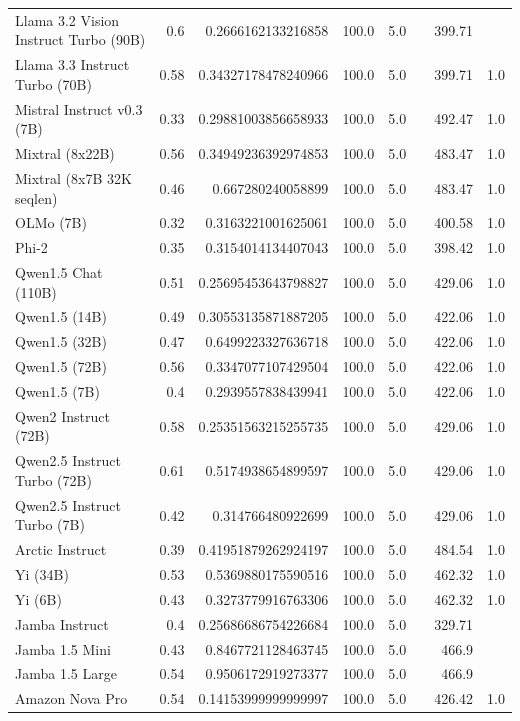 \begin{table}[htp]
{\begin{tabular}{lrrrrrrr}
Llama 3.2 Vision Instruct Turbo (90B) & 0.6 & 0.2666162133216858 & 100.0 & 5.0 &  & 399.71 &  \\
Llama 3.3 Instruct Turbo (70B) & 0.58 & 0.34327178478240966 & 100.0 & 5.0 &  & 399.71 & 1.0 \\
Mistral Instruct v0.3 (7B) & 0.33 & 0.29881003856658933 & 100.0 & 5.0 &  & 492.47 & 1.0 \\
Mixtral (8x22B) & 0.56 & 0.34949236392974853 & 100.0 & 5.0 &  & 483.47 & 1.0 \\
Mixtral (8x7B 32K seqlen) & 0.46 & 0.667280240058899 & 100.0 & 5.0 &  & 483.47 & 1.0 \\
OLMo (7B) & 0.32 & 0.3163221001625061 & 100.0 & 5.0 &  & 400.58 & 1.0 \\
Phi-2 & 0.35 & 0.3154014134407043 & 100.0 & 5.0 &  & 398.42 & 1.0 \\
Qwen1.5 Chat (110B) & 0.51 & 0.25695453643798827 & 100.0 & 5.0 &  & 429.06 & 1.0 \\
Qwen1.5 (14B) & 0.49 & 0.30553135871887205 & 100.0 & 5.0 &  & 422.06 & 1.0 \\
Qwen1.5 (32B) & 0.47 & 0.6499223327636718 & 100.0 & 5.0 &  & 422.06 & 1.0 \\
Qwen1.5 (72B) & 0.56 & 0.3347077107429504 & 100.0 & 5.0 &  & 422.06 & 1.0 \\
Qwen1.5 (7B) & 0.4 & 0.2939557838439941 & 100.0 & 5.0 &  & 422.06 & 1.0 \\
Qwen2 Instruct (72B) & 0.58 & 0.25351563215255735 & 100.0 & 5.0 &  & 429.06 & 1.0 \\
Qwen2.5 Instruct Turbo (72B) & 0.61 & 0.5174938654899597 & 100.0 & 5.0 &  & 429.06 & 1.0 \\
Qwen2.5 Instruct Turbo (7B) & 0.42 & 0.314766480922699 & 100.0 & 5.0 &  & 429.06 & 1.0 \\
Arctic Instruct & 0.39 & 0.41951879262924197 & 100.0 & 5.0 &  & 484.54 & 1.0 \\
Yi (34B) & 0.53 & 0.5369880175590516 & 100.0 & 5.0 &  & 462.32 & 1.0 \\
Yi (6B) & 0.43 & 0.3273779916763306 & 100.0 & 5.0 &  & 462.32 & 1.0 \\
Jamba Instruct & 0.4 & 0.25686686754226684 & 100.0 & 5.0 &  & 329.71 &  \\
Jamba 1.5 Mini & 0.43 & 0.8467721128463745 & 100.0 & 5.0 &  & 466.9 &  \\
Jamba 1.5 Large & 0.54 & 0.9506172919273377 & 100.0 & 5.0 &  & 466.9 &  \\
Amazon Nova Pro & 0.54 & 0.14153999999999997 & 100.0 & 5.0 &  & 426.42 & 1.0 \\

\end{tabular}}
\end{table}
